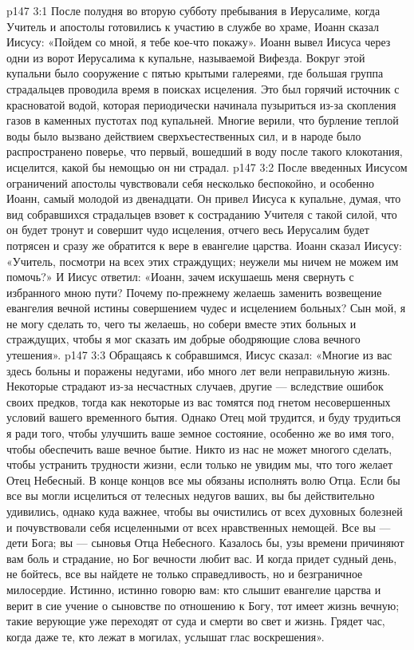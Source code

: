 \vs p147 3:1 После полудня во вторую субботу пребывания в Иерусалиме, когда Учитель и апостолы готовились к участию в службе во храме, Иоанн сказал Иисусу: «Пойдем со мной, я тебе кое\hyp{}что покажу». Иоанн вывел Иисуса через одни из ворот Иерусалима к купальне, называемой Вифезда. Вокруг этой купальни было сооружение с пятью крытыми галереями, где большая группа страдальцев проводила время в поисках исцеления. Это был горячий источник с красноватой водой, которая периодически начинала пузыриться из\hyp{}за скопления газов в каменных пустотах под купальней. Многие верили, что бурление теплой воды было вызвано действием сверхъестественных сил, и в народе было распространено поверье, что первый, вошедший в воду после такого клокотания, исцелится, какой бы немощью он ни страдал.
\vs p147 3:2 После введенных Иисусом ограничений апостолы чувствовали себя несколько беспокойно, и особенно Иоанн, самый молодой из двенадцати. Он привел Иисуса к купальне, думая, что вид собравшихся страдальцев взовет к состраданию Учителя с такой силой, что он будет тронут и совершит чудо исцеления, отчего весь Иерусалим будет потрясен и сразу же обратится к вере в евангелие царства. Иоанн сказал Иисусу: «Учитель, посмотри на всех этих страждущих; неужели мы ничем не можем им помочь?» И Иисус ответил: «Иоанн, зачем искушаешь меня свернуть с избранного мною пути? Почему по\hyp{}прежнему желаешь заменить возвещение евангелия вечной истины совершением чудес и исцелением больных? Сын мой, я не могу сделать то, чего ты желаешь, но собери вместе этих больных и страждущих, чтобы я мог сказать им добрые ободряющие слова вечного утешения».
\vs p147 3:3 Обращаясь к собравшимся, Иисус сказал: «Многие из вас здесь больны и поражены недугами, ибо много лет вели неправильную жизнь. Некоторые страдают из\hyp{}за несчастных случаев, другие --- вследствие ошибок своих предков, тогда как некоторые из вас томятся под гнетом несовершенных условий вашего временного бытия. Однако Отец мой трудится, и буду трудиться я ради того, чтобы улучшить ваше земное состояние, особенно же во имя того, чтобы обеспечить ваше вечное бытие. Никто из нас не может многого сделать, чтобы устранить трудности жизни, если только не увидим мы, что того желает Отец Небесный. В конце концов все мы обязаны исполнять волю Отца. Если бы все вы могли исцелиться от телесных недугов ваших, вы бы действительно удивились, однако куда важнее, чтобы вы очистились от всех духовных болезней и почувствовали себя исцеленными от всех нравственных немощей. Все вы --- дети Бога; вы --- сыновья Отца Небесного. Казалось бы, узы времени причиняют вам боль и страдание, но Бог вечности любит вас. И когда придет судный день, не бойтесь, все вы найдете не только справедливость, но и безграничное милосердие. Истинно, истинно говорю вам: кто слышит евангелие царства и верит в сие учение о сыновстве по отношению к Богу, тот имеет жизнь вечную; такие верующие уже переходят от суда и смерти во свет и жизнь. Грядет час, когда даже те, кто лежат в могилах, услышат глас воскрешения».
